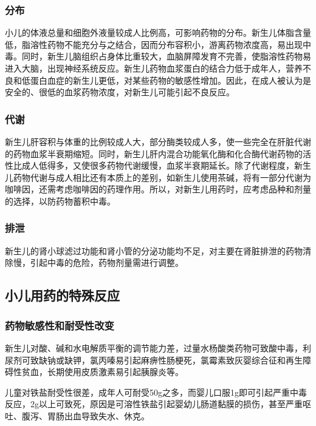 \subsubsection{分布}

小儿的体液总量和细胞外液量较成人比例高，可影响药物的分布。新生儿体脂含量低，脂溶性药物不能充分与之结合，因而分布容积小，游离药物浓度高，易出现中毒。同时，新生儿脑组织占身体比重较大，血脑屏障发育不完善，使脂溶性药物易进入大脑，出现神经系统反应。新生儿药物血浆蛋白的结合力低于成年人，营养不良和低蛋白血症的新生儿更低，对某些药物的敏感性增加。因此，在成人被认为是安全的、很低的血浆药物浓度，对新生儿可能引起不良反应。

\subsubsection{代谢}

新生儿肝容积与体重的比例较成人大，部分酶类较成人多，使一些完全在肝脏代谢的药物血浆半衰期缩短。同时，新生儿肝内混合功能氧化酶和化合酶代谢药物的活性比成人低得多，又使很多药物代谢缓慢，血浆半衰期延长。除了代谢程度，新生儿药物代谢与成人相比还有本质上的差别，如新生儿使用茶碱，将有一部分代谢为咖啡因，还需考虑咖啡因的药理作用。所以，对新生儿用药时，应考虑品种和剂量的选择，以防药物蓄积中毒。

\subsubsection{排泄}

新生儿的肾小球滤过功能和肾小管的分泌功能均不足，对主要在肾脏排泄的药物清除慢，引起中毒的危险，药物剂量需进行调整。

\subsection{小儿用药的特殊反应}

\subsubsection{药物敏感性和耐受性改变}

新生儿对酸、碱和水电解质平衡的调节能力差，过量水杨酸类药物可致酸中毒，利尿剂可致缺钠或缺钾，氯丙嗪易引起麻痹性肠梗死，氯霉素致灰婴综合征和再生障碍性贫血，长期使用皮质激素易引起胰腺炎等。

儿童对铁盐耐受性很差，成年人可耐受50g之多，而婴儿口服1g即可引起严重中毒反应，2g以上可致死，原因是可溶性铁盐引起婴幼儿肠道黏膜的损伤，甚至严重呕吐、腹泻、胃肠出血导致失水、休克。

